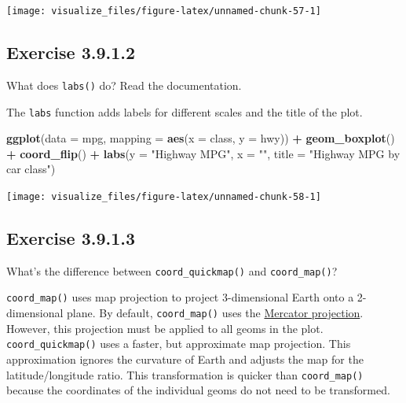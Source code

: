 \documentclass[]{book}
\newenvironment{Shaded}{\begin{snugshade}}{\end{snugshade}}
\newcommand{\DataTypeTok}[1]{\textcolor[rgb]{0.13,0.29,0.53}{#1}}
\newcommand{\KeywordTok}[1]{\textcolor[rgb]{0.13,0.29,0.53}{\textbf{#1}}}
\newcommand{\NormalTok}[1]{#1}
\newcommand{\OperatorTok}[1]{\textcolor[rgb]{0.81,0.36,0.00}{\textbf{#1}}}
\newcommand{\StringTok}[1]{\textcolor[rgb]{0.31,0.60,0.02}{#1}}
\theoremstyle{plain}
\theoremstyle{remark}
\begin{document}
\begin{center}\texttt{[image: visualize\_files/figure-latex/unnamed-chunk-57-1]} \end{center}

\hypertarget{exercise-3.9.1.2}{%
\subsection*{\texorpdfstring{Exercise {3.9.1.2}}{Exercise 3.9.1.2}}\label{exercise-3.9.1.2}}

What does \texttt{labs()} do? Read the documentation.

The \texttt{labs} function adds labels for different scales and the title of the plot.

\begin{Shaded}
\begin{Highlighting}[]
\KeywordTok{ggplot}\NormalTok{(}\DataTypeTok{data =}\NormalTok{ mpg, }\DataTypeTok{mapping =} \KeywordTok{aes}\NormalTok{(}\DataTypeTok{x =}\NormalTok{ class, }\DataTypeTok{y =}\NormalTok{ hwy)) }\OperatorTok{+}
\StringTok{  }\KeywordTok{geom_boxplot}\NormalTok{() }\OperatorTok{+}
\StringTok{  }\KeywordTok{coord_flip}\NormalTok{() }\OperatorTok{+}
\StringTok{  }\KeywordTok{labs}\NormalTok{(}\DataTypeTok{y =} \StringTok{"Highway MPG"}\NormalTok{, }\DataTypeTok{x =} \StringTok{""}\NormalTok{, }\DataTypeTok{title =} \StringTok{"Highway MPG by car class"}\NormalTok{)}
\end{Highlighting}
\end{Shaded}

\begin{center}\texttt{[image: visualize\_files/figure-latex/unnamed-chunk-58-1]} \end{center}

\hypertarget{exercise-3.9.1.3}{%
\subsection*{\texorpdfstring{Exercise {3.9.1.3}}{Exercise 3.9.1.3}}\label{exercise-3.9.1.3}}

What's the difference between \texttt{coord\_quickmap()} and \texttt{coord\_map()}?

\texttt{coord\_map()} uses map projection to project 3-dimensional Earth onto a 2-dimensional plane.
By default, \texttt{coord\_map()} uses the \href{https://en.wikipedia.org/wiki/Mercator_projection}{Mercator projection}.
However, this projection must be applied to all geoms in the plot.
\texttt{coord\_quickmap()} uses a faster, but approximate map projection.
This approximation ignores the curvature of Earth and adjusts the map for the latitude/longitude ratio.
This transformation is quicker than \texttt{coord\_map()} because the coordinates of the individual geoms do not need to be transformed.
\end{document}

